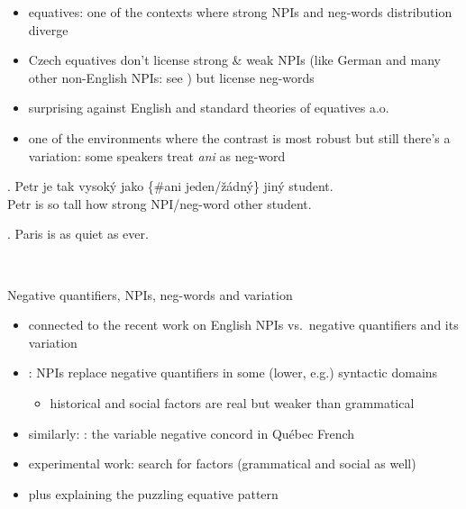 \documentclass[
  ignorenonframetext,
]{beamer}
\providecommand{\tightlist}{%
  \setlength{\itemsep}{0pt}\setlength{\parskip}{0pt}}
\begin{document}
\begin{frame}
\begin{itemize}
\tightlist
\item
  equatives: one of the contexts where strong NPIs and neg-words
  distribution diverge
\item
  Czech equatives don't license strong \& weak NPIs (like German and
  many other non-English NPIs: see \citealt{krifka1992some}) but license
  neg-words
\item
  surprising against English and standard theories of equatives
  \cite{stechow1984comparing,beck201913} a.o.
\item
  one of the environments where the contrast is most robust but still
  there's a variation: some speakers treat \emph{ani} as neg-word
\end{itemize}

\exg. Petr je tak vysoký jako \{\#ani jeden/žádný\} jiný student.\\
Petr is so tall how strong NPI/neg-word other student.\\
\hspace*{0.333em}

\ex. Paris is as quiet as ever.

~
\end{frame}

\begin{frame}
\begin{block}{Negative quantifiers, NPIs, neg-words and variation}
\protect\hypertarget{negative-quantifiers-npis-neg-words-and-variation}{}
\begin{itemize}
\tightlist
\item
  connected to the recent work on English NPIs vs.~negative quantifiers
  and its variation
\item
  \citealt{tottie1991negation,burnett2018structural}: NPIs replace
  negative quantifiers in some (lower, e.g.) syntactic domains

  \begin{itemize}
  \tightlist
  \item
    historical and social factors are real but weaker than grammatical
  \end{itemize}
\item
  similarly: \cite{burnett2015variable}: the variable negative concord
  in Québec French
\item
  experimental work: search for factors (grammatical and social as well)
\item
  plus explaining the puzzling equative pattern
\end{itemize}
\end{block}
\end{frame}
\end{document}
